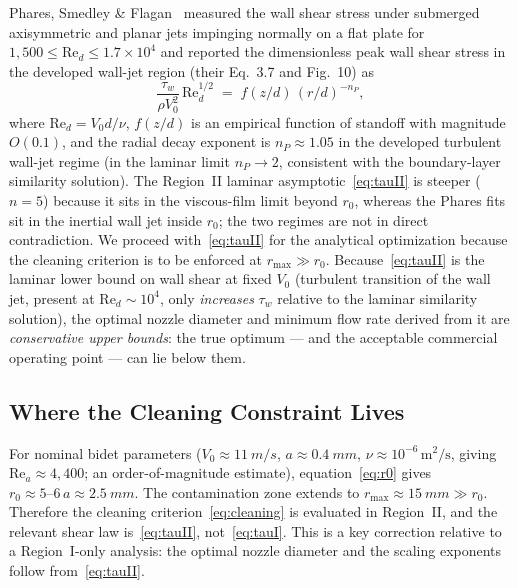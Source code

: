 \documentclass[aps,prfluids,reprint,amsmath,amssymb,floatfix]{revtex4-2}
\newcommand{\Rey}{\mathrm{Re}}
\begin{document}
Phares, Smedley \& Flagan~\citep{Phares2000} measured the wall shear
stress under submerged axisymmetric and planar jets impinging normally
on a flat plate for $1{,}500 \leq \Rey_d \leq 1.7\times 10^4$
and reported the dimensionless peak wall shear stress in the developed
wall-jet region (their Eq.~3.7 and Fig.~10) as
\begin{equation}
  \frac{\tau_w}{\rho V_0^2}\,\Rey_d^{1/2}
  \;=\; f(z/d)\,(r/d)^{-n_P},
  \label{eq:phares}
\end{equation}
where $\Rey_d = V_0 d/\nu$, $f(z/d)$ is an empirical function
of standoff with magnitude $O(0.1)$, and the radial decay exponent is
$n_P \approx 1.05$ in the developed turbulent wall-jet regime
(in the laminar limit $n_P \to 2$, consistent with the boundary-layer
similarity solution). The Region~II laminar
asymptotic~\eqref{eq:tauII} is steeper ($n = 5$) because it sits in
the viscous-film limit beyond $r_0$, whereas the Phares fits sit
in the inertial wall jet inside $r_0$; the two regimes
are not in direct contradiction. We proceed with~\eqref{eq:tauII} for
the analytical optimization because the cleaning criterion is to be
enforced at $r_\mathrm{max} \gg r_0$. Because~\eqref{eq:tauII} is the
laminar lower bound on wall shear at fixed $V_0$ (turbulent transition
of the wall jet, present at $\Rey_d \sim 10^4$, only \emph{increases}
$\tau_w$ relative to the laminar similarity solution), the optimal
nozzle diameter and minimum flow rate derived from it are
\emph{conservative upper bounds}: the true optimum --- and the
acceptable commercial operating point --- can lie below them.

\subsection{Where the Cleaning Constraint Lives}

For nominal bidet parameters
($V_0 \approx \SI{11}{m/s}$, $a \approx \SI{0.4}{mm}$, $\nu \approx 10^{-6}\,\mathrm{m^2/s}$,
giving $\Rey_a \approx 4{,}400$; an order-of-magnitude estimate), equation~\eqref{eq:r0} gives
$r_0 \approx 5\text{--}6\,a \approx \SI{2.5}{mm}$. The contamination zone extends to
$r_\mathrm{max} \approx \SI{15}{mm} \gg r_0$. Therefore the cleaning
criterion~\eqref{eq:cleaning} is evaluated in Region~II, and the relevant
shear law is~\eqref{eq:tauII}, not~\eqref{eq:tauI}. This is a key
correction relative to a Region~I-only analysis: the optimal nozzle
diameter and the scaling exponents follow from~\eqref{eq:tauII}.
\end{document}
